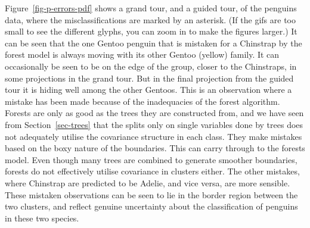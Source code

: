 \documentclass[
  letterpaper,
]{krantz}
\begin{document}
Figure~\ref{fig-p-errors-pdf} shows a grand tour, and a guided tour, of
the penguins data, where the misclassifications are marked by an
asterisk. (If the gifs are too small to see the different glyphs, you
can zoom in to make the figures larger.) It can be seen that the one
Gentoo penguin that is mistaken for a Chinstrap by the forest model is
always moving with its other Gentoo (yellow) family. It can occasionally
be seen to be on the edge of the group, closer to the Chinstraps, in
some projections in the grand tour. But in the final projection from the
guided tour it is hiding well among the other Gentoos. This is an
observation where a mistake has been made because of the inadequacies of
the forest algorithm. Forests are only as good as the trees they are
constructed from, and we have seen from Section~\ref{sec-trees} that the
splits only on single variables done by trees does not adequately
utilise the covariance structure in each class. They make mistakes based
on the boxy nature of the boundaries. This can carry through to the
forests model. Even though many trees are combined to generate smoother
boundaries, forests do not effectively utilise covariance in clusters
either. The other mistakes, where Chinstrap are predicted to be Adelie,
and vice versa, are more sensible. These mistaken observations can be
seen to lie in the border region between the two clusters, and reflect
genuine uncertainty about the classification of penguins in these two
species.
\end{document}
